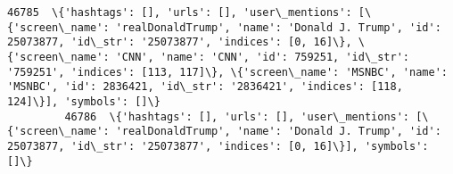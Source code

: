 \documentclass[11pt]{article}
\begin{document}
\begin{Verbatim}[commandchars=\\\{\}]
         46785  \{'hashtags': [], 'urls': [], 'user\_mentions': [\{'screen\_name': 'realDonaldTrump', 'name': 'Donald J. Trump', 'id': 25073877, 'id\_str': '25073877', 'indices': [0, 16]\}, \{'screen\_name': 'CNN', 'name': 'CNN', 'id': 759251, 'id\_str': '759251', 'indices': [113, 117]\}, \{'screen\_name': 'MSNBC', 'name': 'MSNBC', 'id': 2836421, 'id\_str': '2836421', 'indices': [118, 124]\}], 'symbols': []\}                                                                                                                                                                                                                                                                                                                                                                                                                                                                                                                                                                                                                                                                                                                                                                                                                  
         46786  \{'hashtags': [], 'urls': [], 'user\_mentions': [\{'screen\_name': 'realDonaldTrump', 'name': 'Donald J. Trump', 'id': 25073877, 'id\_str': '25073877', 'indices': [0, 16]\}], 'symbols': []\}                                                                                                                                                                                                                                                                                                                                                                                                                                                                                                                                                                                                                                                                                                                                                                                                                                                                                                                                                                                                                        

\end{Verbatim}
\end{document}
